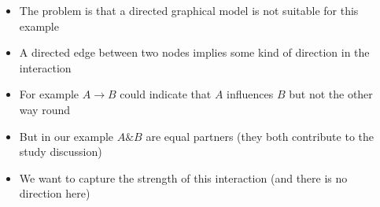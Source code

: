 \begin{frame}
	\begin{columns}
		\begin{overlayarea}{\textwidth}{\textheight}
		\vspace{0.1in}
		\begin{center}
		\end{center}
		\end{overlayarea}
		\begin{overlayarea}{\textwidth}{\textheight}
			\begin{itemize}\justifying 
			\item <1->The problem is that a directed graphical model is not suitable for this example
			\item <2->A directed edge between two nodes implies some kind of direction in the interaction
			\item <3->For example $A \rightarrow B$ could indicate that $A$ influences $B$ but not the other way round
			\item <4->But in our example $A \& B$ are equal partners (they both contribute to the study discussion)
			\item <5-> We want to capture the strength of this interaction (and there is no direction here)
			\end{itemize}
		\end{overlayarea}
	\end{columns}
\end{frame}

